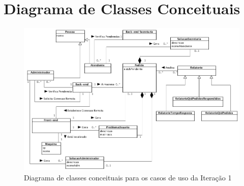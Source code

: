 \documentclass[brazil,times]{abnt}
\begin{document}
\newpage

\section{Diagrama de Classes Conceituais}
\begin{figure}[htp]
\begin{center}
  \includegraphics[width=\linewidth]{diagramas/diagramaConceitual.png}
  \caption[Diagrama de classes conceituais para os casos de uso
  da Iteração 1]{Diagrama de classes conceituais para os casos de uso
  da Iteração 1}
  \label{diagrama-conceitual}
\end{center}
\end{figure}
\end{document}
